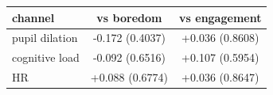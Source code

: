 \begin{tabular}{lcc}
\hline
channel & vs boredom & vs engagement \\
\hline
pupil dilation & -0.172 (0.4037) & +0.036 (0.8608) \\
cognitive load & -0.092 (0.6516) & +0.107 (0.5954) \\
HR & +0.088 (0.6774) & +0.036 (0.8647) \\
\hline
\end{tabular}
